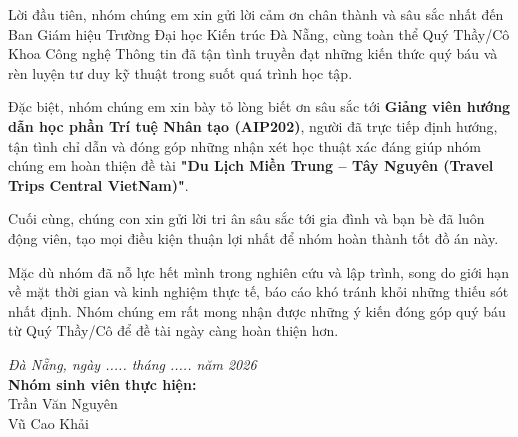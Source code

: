 \begin{acknowledgments}
Lời đầu tiên, nhóm chúng em xin gửi lời cảm ơn chân thành và sâu sắc nhất đến Ban Giám hiệu Trường Đại học Kiến trúc Đà Nẵng, cùng toàn thể Quý Thầy/Cô Khoa Công nghệ Thông tin đã tận tình truyền đạt những kiến thức quý báu và rèn luyện tư duy kỹ thuật trong suốt quá trình học tập.

Đặc biệt, nhóm chúng em xin bày tỏ lòng biết ơn sâu sắc tới \textbf{Giảng viên hướng dẫn học phần Trí tuệ Nhân tạo (AIP202)}, người đã trực tiếp định hướng, tận tình chỉ dẫn và đóng góp những nhận xét học thuật xác đáng giúp nhóm chúng em hoàn thiện đề tài \textbf{"Du Lịch Miền Trung -- Tây Nguyên (Travel Trips Central VietNam)"}.

Cuối cùng, chúng con xin gửi lời tri ân sâu sắc tới gia đình và bạn bè đã luôn động viên, tạo mọi điều kiện thuận lợi nhất để nhóm hoàn thành tốt đồ án này.

Mặc dù nhóm đã nỗ lực hết mình trong nghiên cứu và lập trình, song do giới hạn về mặt thời gian và kinh nghiệm thực tế, báo cáo khó tránh khỏi những thiếu sót nhất định. Nhóm chúng em rất mong nhận được những ý kiến đóng góp quý báu từ Quý Thầy/Cô để đề tài ngày càng hoàn thiện hơn.

\vspace{1.0cm}
\begin{flushright}
\textit{Đà Nẵng, ngày ..... tháng ..... năm 2026}\\[0.2cm]
\textbf{Nhóm sinh viên thực hiện:}\\[0.1cm]
Trần Văn Nguyên\\
Vũ Cao Khải
\end{flushright}
\end{acknowledgments}
